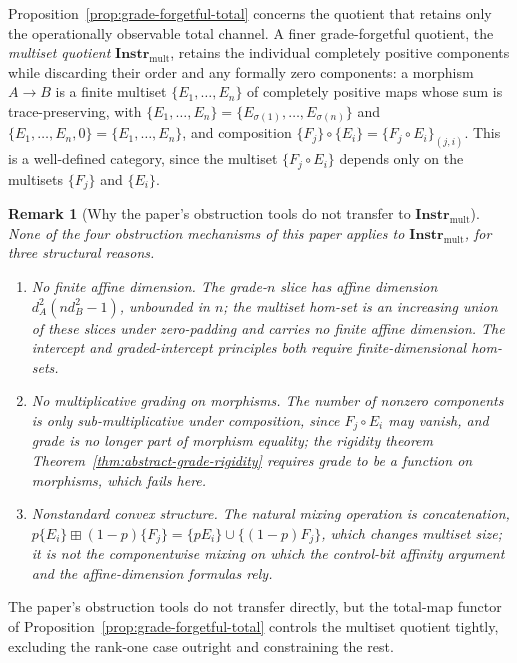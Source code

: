 \documentclass[11pt]{article}
\newtheorem{remark}[theorem]{Remark}
\begin{document}
Proposition~\ref{prop:grade-forgetful-total} concerns the quotient that retains
only the operationally observable total channel. A finer grade-forgetful
quotient, the \emph{multiset quotient} $\mathbf{Instr}_{\mathrm{mult}}$, retains
the individual completely positive components while discarding their order and
any formally zero components: a morphism $A\to B$ is a finite multiset
$\{E_1,\dots,E_n\}$ of completely positive maps whose sum is trace-preserving,
with $\{E_1,\dots,E_n\}=\{E_{\sigma(1)},\dots,E_{\sigma(n)}\}$ and
$\{E_1,\dots,E_n,0\}=\{E_1,\dots,E_n\}$, and composition
$\{F_j\}\circ\{E_i\}=\{F_j\circ E_i\}_{(j,i)}$. This is a well-defined category,
since the multiset $\{F_j\circ E_i\}$ depends only on the multisets $\{F_j\}$ and
$\{E_i\}$.

\begin{remark}[Why the paper's obstruction tools do not transfer to $\mathbf{Instr}_{\mathrm{mult}}$]
\label{rem:multiset-tools}
None of the four obstruction mechanisms of this paper applies to
$\mathbf{Instr}_{\mathrm{mult}}$, for three structural reasons.
\begin{enumerate}
\item \emph{No finite affine dimension.} The grade-$n$ slice has affine
dimension $d_A^2(nd_B^2-1)$, unbounded in $n$; the multiset hom-set is an
increasing union of these slices under zero-padding and carries no finite affine
dimension. The intercept and graded-intercept principles both require
finite-dimensional hom-sets.
\item \emph{No multiplicative grading on morphisms.} The number of nonzero
components is only sub-multiplicative under composition, since $F_j\circ E_i$ may
vanish, and grade is no longer part of morphism equality; the rigidity theorem
Theorem~\ref{thm:abstract-grade-rigidity} requires grade to be a function on
morphisms, which fails here.
\item \emph{Nonstandard convex structure.} The natural mixing operation is
concatenation, $p\{E_i\}\boxplus(1-p)\{F_j\}=\{pE_i\}\cup\{(1-p)F_j\}$, which
changes multiset size; it is not the componentwise mixing on which the
control-bit affinity argument and the affine-dimension formulas rely.
\end{enumerate}
\end{remark}

The paper's obstruction tools do not transfer directly, but the total-map
functor of Proposition~\ref{prop:grade-forgetful-total} controls the multiset
quotient tightly, excluding the rank-one case outright and constraining the
rest.
\end{document}
